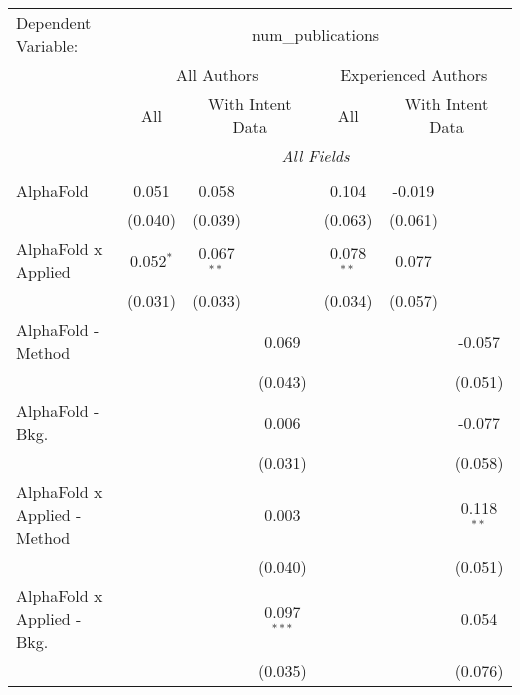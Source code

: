 \begingroup
\centering
\begin{tabular}{lcccccc}
   \tabularnewline \midrule \midrule
   Dependent Variable: & \multicolumn{6}{c}{num\_publications}\\
 & \multicolumn{3}{c}{All Authors} & \multicolumn{3}{c}{Experienced Authors} \\
\cmidrule(lr){2-4} \cmidrule(lr){5-7}
 & \multicolumn{1}{c}{All} & \multicolumn{2}{c}{With Intent Data} & \multicolumn{1}{c}{All} & \multicolumn{2}{c}{With Intent Data} \\
\cmidrule(lr){2-2} \cmidrule(lr){3-4} \cmidrule(lr){5-5} \cmidrule(lr){6-7}
 & \multicolumn{6}{c}{\textit{All Fields}} \\ \\
   AlphaFold                      & 0.051         & 0.058        &               & 0.104         & -0.019  &   \\   
                                  & (0.040)       & (0.039)      &               & (0.063)       & (0.061) &   \\   
   AlphaFold x Applied            & 0.052$^{*}$   & 0.067$^{**}$ &               & 0.078$^{**}$  & 0.077   &   \\   
                                  & (0.031)       & (0.033)      &               & (0.034)       & (0.057) &   \\   
   AlphaFold - Method             &               &              & 0.069         &               &         & -0.057\\   
                                  &               &              & (0.043)       &               &         & (0.051)\\   
   AlphaFold - Bkg.               &               &              & 0.006         &               &         & -0.077\\   
                                  &               &              & (0.031)       &               &         & (0.058)\\   
   AlphaFold x Applied - Method   &               &              & 0.003         &               &         & 0.118$^{**}$\\   
                                  &               &              & (0.040)       &               &         & (0.051)\\   
   AlphaFold x Applied - Bkg.     &               &              & 0.097$^{***}$ &               &         & 0.054\\   
                                  &               &              & (0.035)       &               &         & (0.076)\\   

\end{tabular}
